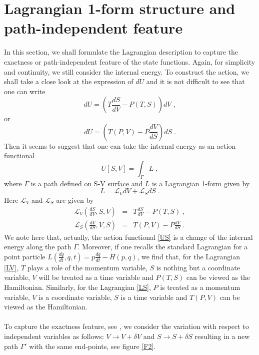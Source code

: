 \documentclass[12pt]{article}
\numberwithin{equation}{section}
\theoremstyle{remark}
\theoremstyle{definition}
\begin{document}
\section{Lagrangian 1-form structure and path-independent feature}\label{LI}
In this section, we shall formulate the Lagrangian description to capture the exactness or path-independent feature of the state functions. Again, for simplicity and continuity, we still consider the internal energy.  To construct the action, we shall take a close look at the expression of $dU$ and it is not difficult to see that one can write
\begin{equation}
    dU=\left(T\frac{dS}{dV}-P(T,S)\right)dV\;,
\end{equation}
or
\begin{equation}
    dU=\left(T(P,V)-P\frac{dV}{dS}\right)dS\;.
\end{equation}
Then it seems to suggest that one can take the internal energy as an action functional
\begin{equation}
    U[S,V]=\int_\Gamma L\;,\label{US}
\end{equation}
where $\Gamma$ is a path defined on S-V surface and $L$ is a Lagrangian 1-form given by
\begin{equation}
    L=\mathcal{L}_VdV+\mathcal{L}_SdS\;.
\end{equation}
Here $\mathcal{L}_V$ and $\mathcal{L}_S$ are given by
\begin{eqnarray}
    \mathcal{L}_V\left(\frac{dS}{dV},S,V\right)&=&T\frac{dS}{dV}-P(T,S)\;,\label{LV}\\
    \mathcal{L}_S\left(\frac{dV}{dS},V,S\right)&=&T(P,V)-P\frac{dV}{dS}\;\label{LS}.
\end{eqnarray}
We note here that, actually, the action functional \eqref{US} is a change of the internal energy along the path $\Gamma$. Moreover, if one recalls the standard Lagrangian for a point particle $L(\frac{dq}{dt},q,t)=p\frac{dq}{dt}-H(p,q)$, we find that, for the Lagrangian \eqref{LV}, $T$ plays a role of the momentum variable, $S$ is nothing but a coordinate variable, $V$ will be treated as a time variable and $P(T,S)$ can be viewed as the Hamiltonian. Similarly, for the Lagrangian \eqref{LS}, $P$ is treated as a momentum variable, $V$ is a coordinate variable, $S$ is a time variable and $T(P,V)$ can be viewed as the Hamiltonian.
\\
\\
To capture the exactness feature, see \cite{Yookong1,Yookong2}, we consider the variation with respect to independent variables as follows: $V\rightarrow V+\delta V $ and $S\rightarrow S+\delta S $ resulting in a new path $\Gamma'$ with the same end-points, see figure \ref{F2}. 
\end{document}
